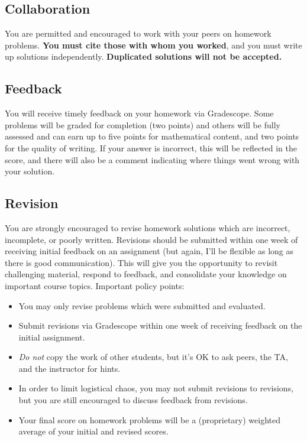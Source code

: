 \documentclass[11pt,twoside]{amsart}
\begin{document}
\subsection*{Collaboration}
You are permitted and encouraged to work with your peers on homework problems.  \textbf{You must cite those with whom you worked}, and you must write up solutions independently.  \textbf{Duplicated solutions will not be accepted.}

\subsection*{Feedback}
You will receive timely feedback on your homework via Gradescope.  Some problems will be graded for completion (two points) and others will be fully assessed and can earn up to five points for mathematical content, and two points for the quality of writing.  If your answer is incorrect, this will be reflected in the score, and there will also be a comment indicating where things went wrong with your solution.

\subsection*{Revision}
You are strongly encouraged to revise homework solutions which are incorrect, incomplete, or poorly written. Revisions should be submitted within one week of receiving initial feedback on an assignment (but again, I'll be flexible as long as there is good communication). This will give you the opportunity to revisit challenging material, respond to feedback, and consolidate your knowledge on important course topics. Important policy points:
\begin{itemize}
\item You may only revise problems which were submitted and evaluated.
\item Submit revisions via Gradescope within one week of receiving feedback on the initial assignment.
\item \emph{Do not} copy the work of other students, but it's OK to ask peers, the TA, and the instructor for hints.
\item In order to limit logistical chaos, you may not submit revisions to revisions, but you are still encouraged to discuss feedback from revisions.
\item Your final score on homework problems will be a (proprietary) weighted average of your initial and revised scores.
\end{itemize}
\end{document}
